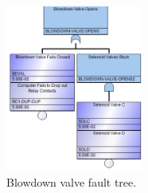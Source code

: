 \begin{figure}[H]
    \centering
    \includegraphics[width=0.4\textwidth]{3_identifying_gaps/benchmarking/datasets/figures/blowdown_valve_fault_tree.png}
    \caption{Blowdown valve fault tree.}
    \label{fig:blowdown_valve_fault_tree}
\end{figure}